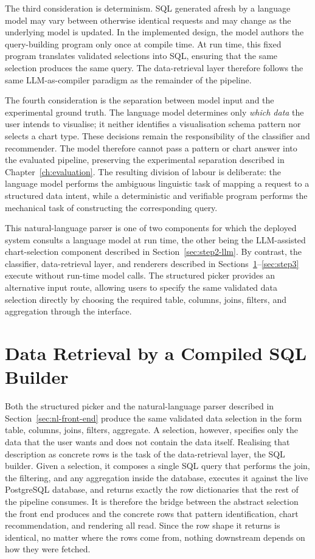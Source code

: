 The third consideration is determinism. SQL generated afresh by a language model may vary between otherwise identical requests and may change as the underlying model is updated. In the implemented design, the model authors the query-building program only once at compile time. At run time, this fixed program translates validated selections into SQL, ensuring that the same selection produces the same query. The data-retrieval layer therefore follows the same LLM-as-compiler paradigm as the remainder of the pipeline.

The fourth consideration is the separation between model input and the experimental ground truth. The language model determines only \emph{which data} the user intends to visualise; it neither identifies a visualisation schema pattern nor selects a chart type. These decisions remain the responsibility of the classifier and recommender. The model therefore cannot pass a pattern or chart answer into the evaluated pipeline, preserving the experimental separation described in Chapter~\ref{ch:evaluation}. The resulting division of labour is deliberate: the language model performs the ambiguous linguistic task of mapping a request to a structured data intent, while a deterministic and verifiable program performs the mechanical task of constructing the corresponding query.

This natural-language parser is one of two components for which the deployed system consults a language model at run time, the other being the LLM-assisted chart-selection component described in Section~\ref{sec:step2-llm}. By contrast, the classifier, data-retrieval layer, and renderers described in Sections~\ref{sec:step0}--\ref{sec:step3} execute without run-time model calls. The structured picker provides an alternative input route, allowing users to specify the same validated data selection directly by choosing the required table, columns, joins, filters, and aggregation through the interface.



\section{Data Retrieval by a Compiled SQL Builder}
\label{sec:step0}

Both the structured picker and the natural-language parser described in Section~\ref{sec:nl-front-end} produce the same validated data selection in the form {table, columns, joins, filters, aggregate}. A selection, however, specifies only the data that the user wants and does not contain the data itself. Realising that description as concrete rows is the task of the data-retrieval layer, the SQL builder. Given a selection, it composes a single SQL query that performs the join, the filtering, and any aggregation inside the database, executes it against the live PostgreSQL database, and returns exactly the row dictionaries that the rest of the pipeline consumes. It is therefore the bridge between the abstract selection the front end produces and the concrete rows that pattern identification, chart recommendation, and rendering all read. Since the row shape it returns is identical, no matter where the rows come from, nothing downstream depends on how they were fetched.

